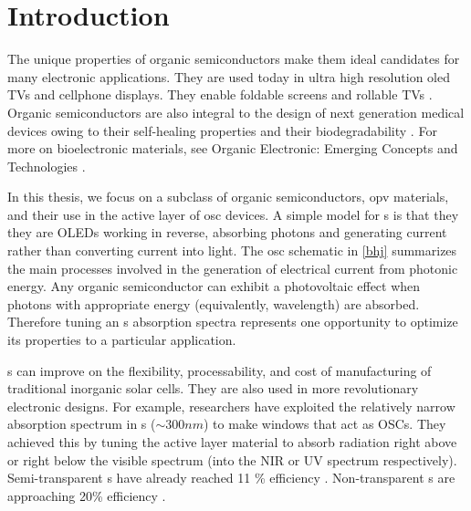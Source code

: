\chapter{Introduction} 

%
The unique properties of organic semiconductors make them ideal candidates for
many electronic applications.
They are used today in ultra high resolution \gls{oled} 
TVs and cellphone displays.
They enable 
foldable  screens and rollable TVs \cite{Chen2020}.
Organic semiconductors are also integral to the design of next generation medical devices owing to their
self-healing properties and their biodegradability \cite{Bettinger2010}.
For more on bioelectronic materials, see Organic Electronic: Emerging Concepts and Technologies
\cite{FabioCicoiraEditor2013}.

In this thesis, we focus on a subclass of organic semiconductors, \gls{opv} materials, and their use in the
active layer of \gls{osc} devices.
A simple model for s is that they they are OLEDs working in reverse, absorbing photons and generating current rather than converting current into light.
The \gls{osc} schematic in \autoref{bhj} summarizes the main processes involved in the generation of electrical current from photonic energy. 
Any organic semiconductor can exhibit a photovoltaic effect when photons with appropriate energy (equivalently, wavelength) are absorbed.
Therefore tuning an s absorption spectra represents one opportunity to optimize its
properties to a particular application.

s can improve on the 
flexibility, processability, and cost of manufacturing of traditional inorganic solar cells.
They are also used in more revolutionary electronic designs.
For example, researchers have exploited the relatively narrow absorption spectrum in s
(${\sim}300nm$) to make windows that act as OSCs. 
They achieved this by tuning the active layer material to absorb radiation right above or right below the
visible spectrum (into the NIR or UV spectrum respectively). 
Semi-transparent s have already
reached 11 \% efficiency \cite{Brabec2020}. Non-transparent s are approaching 20\% efficiency \cite{Liu2020b}.

